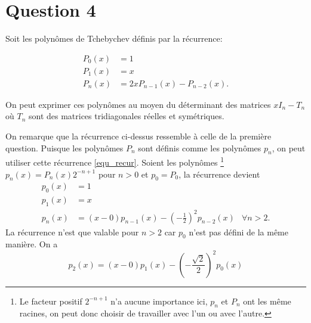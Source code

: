 \section*{Question 4}
Soit les polynômes de Tchebychev définis par la récurrence:

\begin{align*}
  P_0(x) & = 1\\
  P_1(x) & = x\\
  P_n(x) & = 2xP_{n-1}(x) - P_{n-2}(x).
\end{align*}

On peut exprimer ces polynômes au moyen du déterminant des matrices $xI_n - T_n$ où $T_n$ sont des matrices tridiagonales réelles et symétriques.

On remarque que la récurrence ci-dessus ressemble à celle de la première question.
Puisque les polynômes $P_n$ sont définis comme les polynômes $p_n$,
on peut utiliser cette récurrence \eqref{equ_recur}.
Soient les polynômes
\footnote{Le facteur positif $2^{-n+1}$ n'a aucune importance ici,
$p_n$ et $P_n$ ont les même racines,
on peut donc choisir de travailler avec l'un ou avec l'autre.}
$p_n(x) = P_n(x)2^{-n+1}$ pour $n > 0$ et $p_0 = P_0$, la récurrence devient
\begin{align*}
  p_0(x) & = 1\\
  p_1(x) & = x\\
  p_n(x) & = (x - 0)p_{n-1}(x) - \left(-\frac{1}{2}\right)^2p_{n-2}(x) & \forall n > 2.
\end{align*}
La récurrence n'est que valable pour $n > 2$ car $p_0$ n'est pas défini de
la même manière.
On a
\[ p_2(x) = (x - 0)p_1(x) - \left(-\frac{\sqrt{2}}{2}\right)^2p_0(x) \]

